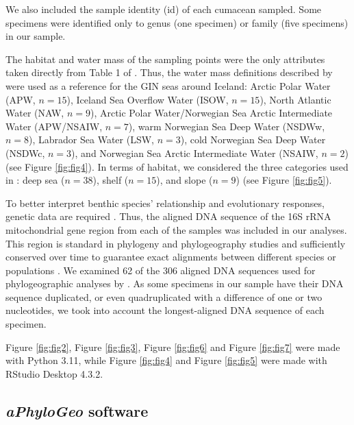 We also included the sample identity (id) of each cumacean sampled. Some specimens were identified only to genus (one specimen) or family (five specimens) in our sample.
 
The habitat and water mass of the sampling points were the only attributes taken directly from Table 1 of \citep{uhlir_adding_2021}. Thus, the water mass definitions described by \citep{hansen_north_2000, brix2010distribution, ostmann_marine_2014} were used as a reference for the GIN seas around Iceland: Arctic Polar Water (APW, $n=15$), Iceland Sea Overflow Water (ISOW, $n=15$), North Atlantic Water (NAW, $n=9$), Arctic Polar Water/Norwegian Sea Arctic Intermediate Water (APW/NSAIW, $n=7$), warm Norwegian Sea Deep Water (NSDWw, $n=8$), Labrador Sea Water (LSW, $n=3$), cold Norwegian Sea Deep Water (NSDWc, $n=3$), and Norwegian Sea Arctic Intermediate Water (NSAIW, $n=2$) (see Figure \ref{fig:fig4}). In terms of habitat, we considered the three categories used in \citep{uhlir_adding_2021}: deep sea ($n=38$), shelf ($n=15$), and slope ($n=9$) (see Figure \ref{fig:fig5}).

To better interpret benthic species' relationship and evolutionary responses, genetic data are required \citep{wilson_speciation_1987, uhlir_adding_2021}. Thus, the aligned DNA sequence of the 16S rRNA mitochondrial gene region from each of the samples was included in our analyses. This region is standard in phylogeny and phylogeography studies \citep{hugenholtz1998impact} and sufficiently conserved over time to guarantee exact alignments between different species or populations \citep{saccone1999evolutionary}. We examined 62 of the 306 aligned DNA sequences used for phylogeographic analyses by \citep{uhlir_adding_2021}. As some specimens in our sample have their DNA sequence duplicated, or even quadruplicated with a difference of one or two nucleotides, we took into account the longest-aligned DNA sequence of each specimen.

Figure \ref{fig:fig2}, Figure \ref{fig:fig3}, Figure \ref{fig:fig6} and Figure \ref{fig:fig7} were made with Python 3.11, while Figure \ref{fig:fig4} and Figure \ref{fig:fig5} were made with RStudio Desktop 4.3.2.

\subsection{{\textit{aPhyloGeo} software}\label{aPhyloGeo-software}}

